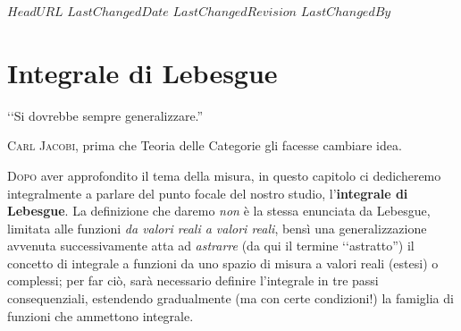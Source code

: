 \svnidlong
{$HeadURL$}
{$LastChangedDate$}
{$LastChangedRevision$}
{$LastChangedBy$}

\chapter{Integrale di Lebesgue}

\begin{introduction}
	‘‘Si dovrebbe sempre generalizzare.''
	\begin{flushright}
		\textsc{Carl Jacobi,} prima che Teoria delle Categorie gli facesse cambiare idea.
	\end{flushright}
\end{introduction}
\lettrine[findent=1pt, nindent=0pt]{D}{opo} aver approfondito il tema della misura, in questo capitolo ci dedicheremo integralmente a parlare del punto focale del nostro studio, l'\textbf{integrale di Lebesgue}. La definizione che daremo \textit{non} è la stessa enunciata da Lebesgue, limitata alle funzioni \textit{da valori reali a valori reali}, bensì una generalizzazione avvenuta successivamente atta ad \textit{astrarre} (da qui il termine ‘‘astratto'') il concetto di integrale a funzioni da uno spazio di misura a valori reali (estesi) o complessi; per far ciò, sarà necessario definire l'integrale in tre passi consequenziali, estendendo gradualmente (ma con certe condizioni!) la famiglia di funzioni che ammettono integrale.
